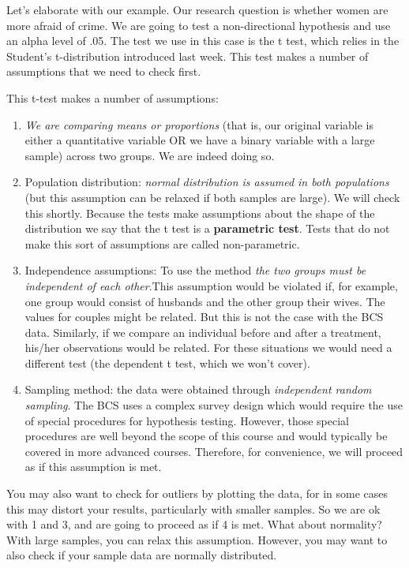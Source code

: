 \documentclass[
]{book}
\begin{document}
Let's elaborate with our example. Our research question is whether women are more afraid of crime. We are going to test a non-directional hypothesis and use an alpha level of .05. The test we use in this case is the t test, which relies in the Student's t-distribution introduced last week. This test makes a number of assumptions that we need to check first.

This t-test makes a number of assumptions:

\begin{enumerate}
\def\labelenumi{\arabic{enumi}.}
\item
  \emph{We are comparing means or proportions} (that is, our original variable is either a quantitative variable OR we have a binary variable with a large sample) across two groups. We are indeed doing so.
\item
  Population distribution: \emph{normal distribution is assumed in both populations} (but this assumption can be relaxed if both samples are large). We will check this shortly. Because the tests make assumptions about the shape of the distribution we say that the t test is a \textbf{parametric test}. Tests that do not make this sort of assumptions are called non-parametric.
\item
  Independence assumptions: To use the method \emph{the two groups must be independent of each other}.This assumption would be violated if, for example, one group would consist of husbands and the other group their wives. The values for couples might be related. But this is not the case with the BCS data. Similarly, if we compare an individual before and after a treatment, his/her observations would be related. For these situations we would need a different test (the dependent t test, which we won't cover).
\item
  Sampling method: the data were obtained through \emph{independent random sampling}. The BCS uses a complex survey design which would require the use of special procedures for hypothesis testing. However, those special procedures are well beyond the scope of this course and would typically be covered in more advanced courses. Therefore, for convenience, we will proceed as if this assumption is met.
\end{enumerate}

You may also want to check for outliers by plotting the data, for in some cases this may distort your results, particularly with smaller samples. So we are ok with 1 and 3, and are going to proceed as if 4 is met. What about normality? With large samples, you can relax this assumption. However, you may want to also check if your sample data are normally distributed.
\end{document}
